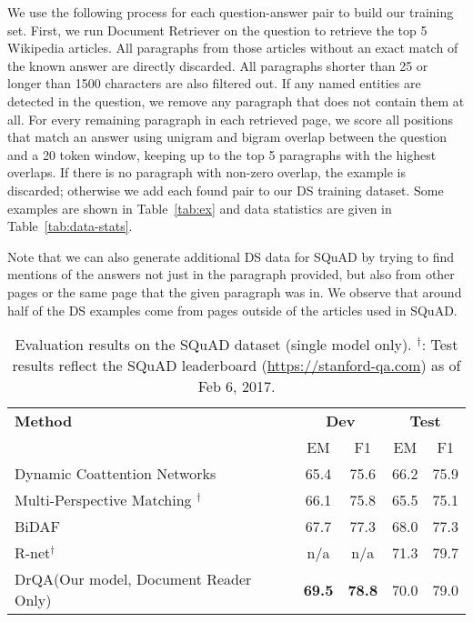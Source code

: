 \documentclass[11pt,a4paper]{article}
\newcommand\us{DrQA\xspace}
\newcommand\usr{Document Retriever\xspace}
\newcommand{\finalem}{70.0}
\newcommand{\finalf}{79.0}
\begin{document}
We use the following process for each question-answer pair to build our training set.
First, we run \usr on the question to retrieve the top 5 Wikipedia articles.
All paragraphs from those articles without an exact match of the known answer are directly discarded.
All paragraphs  shorter than 25 or longer than 1500  characters are also filtered out.
If any named entities are detected in the question, we remove any paragraph that does not contain them at all.
For every remaining paragraph in each retrieved page, we score all positions that match an answer using unigram and bigram overlap between the question and a 20 token window, keeping up to the top 5 paragraphs with the highest overlaps. If there is no paragraph with non-zero overlap, the example is discarded; otherwise we add each found pair to our DS training dataset. Some examples are shown in Table~\ref{tab:ex} and data statistics are given in Table~\ref{tab:data-stats}.

Note that we can also generate additional DS data for SQuAD by trying to find mentions of the answers not just in the paragraph provided, but also from other pages or the same page that the given paragraph was in. We observe that around half of the DS examples come from pages outside of the articles used in SQuAD.

\begin{table*}[t]
\begin{center}
\begin{tabular}{l|c@{\,\,\,\,}cc@{\,\,\,\,}c}
\hline
 \bf Method &  \multicolumn{2}{c}{\bf Dev} & \multicolumn{2}{c}{\bf Test} \\
&  EM & F1 & EM & F1 \\
\hline
Dynamic Coattention Networks \cite{xiong2016dynamic} & 65.4 & 75.6 & 66.2 & 75.9 \\
Multi-Perspective Matching \cite{wang2016multi}$^\dagger$   & 66.1 & 75.8 & 65.5 & 75.1 \\
BiDAF \cite{seo2016bidirectional} & 67.7 & 77.3 & 68.0 & 77.3 \\
R-net$^\dagger$   & n/a & n/a & 71.3 & 79.7 \\
\hline
\us (Our model, Document Reader Only) & \bf 69.5 & \bf 78.8 & {\finalem} & {\finalf} \\
\hline
\end{tabular}
\end{center}
\caption{\label{tab:squad-res} Evaluation results on the SQuAD dataset (single model only). $^\dagger$: Test results reflect the SQuAD leaderboard {\small(\url{https://stanford-qa.com})} as of Feb 6, 2017.}
\end{table*}
\end{document}
